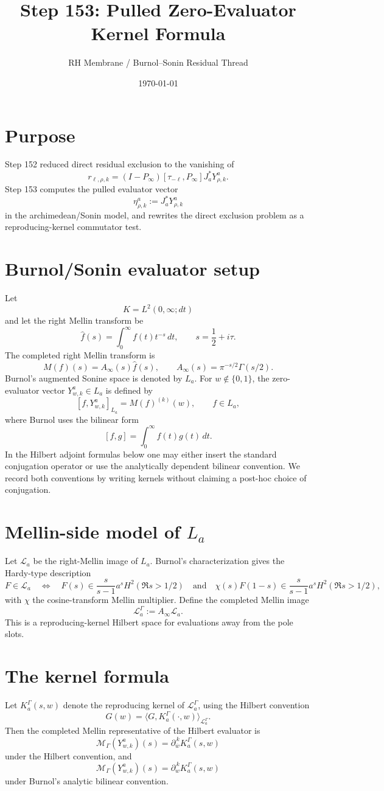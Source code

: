 \documentclass[11pt]{article}
\title{Step 153: Pulled Zero-Evaluator Kernel Formula}
\author{RH Membrane / Burnol--Sonin Residual Thread}
\date{\today}
\begin{document}
\maketitle

\section{Purpose}
Step 152 reduced direct residual exclusion to the vanishing of
\[
  r_{\ell,\rho,k}
  =
  (I-P_\infty)[\tau_{-\ell},P_\infty]J_a^*Y^a_{\rho,k}.
\]
Step 153 computes the pulled evaluator vector
\[
  \eta^a_{\rho,k}:=J_a^*Y^a_{\rho,k}
\]
in the archimedean/Sonin model, and rewrites the direct exclusion problem as a reproducing-kernel commutator test.

\section{Burnol/Sonin evaluator setup}
Let
\[
  K=L^2(0,\infty;dt)
\]
and let the right Mellin transform be
\[
  \widehat f(s)=\int_0^\infty f(t)t^{-s}\,dt,
  \qquad s=\frac12+i\tau.
\]
The completed right Mellin transform is
\[
  M(f)(s)=A_\infty(s)\widehat f(s),
  \qquad
  A_\infty(s)=\pi^{-s/2}\Gamma(s/2).
\]
Burnol's augmented Sonine space is denoted by \(L_a\). For \(w\notin\{0,1\}\), the zero-evaluator vector \(Y^a_{w,k}\in L_a\) is defined by
\[
  [f,Y^a_{w,k}]_{L_a}=M(f)^{(k)}(w),
  \qquad f\in L_a,
\]
where Burnol uses the bilinear form
\[
  [f,g]=\int_0^\infty f(t)g(t)\,dt.
\]
In the Hilbert adjoint formulas below one may either insert the standard conjugation operator or use the analytically dependent bilinear convention. We record both conventions by writing kernels without claiming a post-hoc choice of conjugation.

\section{Mellin-side model of \texorpdfstring{$L_a$}{La}}
Let \(\mathcal L_a\) be the right-Mellin image of \(L_a\). Burnol's characterization gives the Hardy-type description
\[
  F\in \mathcal L_a
  \quad\Longleftrightarrow\quad
  F(s)\in \frac{s}{s-1}a^sH^2(\Re s>1/2)
  \quad\text{and}\quad
  \chi(s)F(1-s)\in \frac{s}{s-1}a^sH^2(\Re s>1/2),
\]
with \(\chi\) the cosine-transform Mellin multiplier.
Define the completed Mellin image
\[
  \mathcal L_a^\Gamma:=A_\infty\mathcal L_a.
\]
This is a reproducing-kernel Hilbert space for evaluations away from the pole slots.

\section{The kernel formula}
Let \(K_a^\Gamma(s,w)\) denote the reproducing kernel of \(\mathcal L_a^\Gamma\), using the Hilbert convention
\[
  G(w)=\langle G,K_a^\Gamma(\cdot,w)\rangle_{\mathcal L_a^\Gamma}.
\]
Then the completed Mellin representative of the Hilbert evaluator is
\[
  \mathcal M_\Gamma(Y^a_{w,k})(s)
  =
  \partial_{\overline w}^{\,k}K_a^\Gamma(s,w)
\]
under the Hilbert convention, and
\[
  \mathcal M_\Gamma(Y^a_{w,k})(s)
  =
  \partial_{w}^{\,k}K_a^\Gamma(s,w)
\]
under Burnol's analytic bilinear convention.
\end{document}
